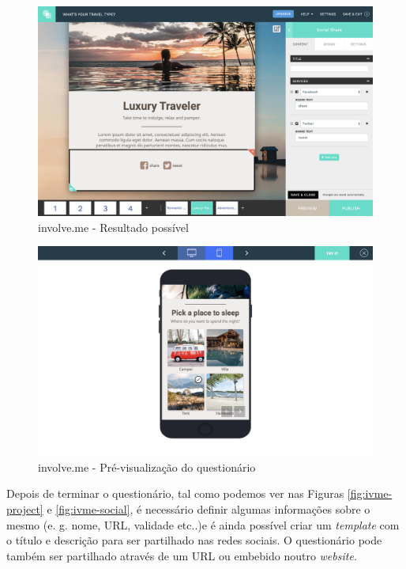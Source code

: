 \begin{figure}[ht!]
	\begin{center}
		\includegraphics[width=1\textwidth]{img/ivme/result}
		\caption{involve.me - Resultado possível}
		\label{fig:ivme-result}
	\end{center}
\end{figure}
 
 \begin{figure}[ht!]
 	\begin{center}
 		\includegraphics[width=1\textwidth]{img/ivme/preview}
 		\caption{involve.me - Pré-visualização do questionário}
 		\label{fig:ivme-preview}
 	\end{center}
 \end{figure}
\newpage

Depois de terminar o questionário, tal como podemos ver nas Figuras \ref{fig:ivme-project} e \ref{fig:ivme-social}, é necessário definir algumas informações sobre o mesmo (e. g. nome, URL, validade etc..)e é ainda possível criar um \textit{template} com o título e descrição para ser partilhado nas redes sociais. O questionário pode também ser partilhado através de um URL ou embebido noutro \textit{website}.


